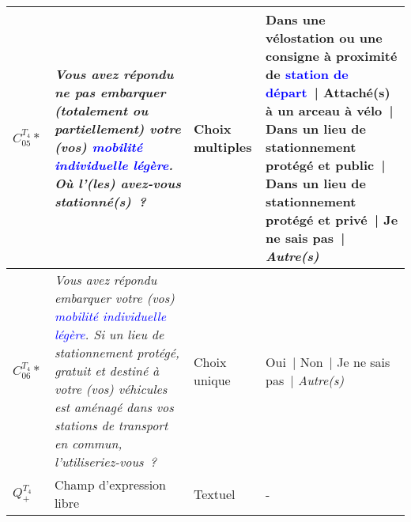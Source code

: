 \begin{table}[h!]
{\begin{tabular}{p{}p{}p{}p{}}
\hline
    \small{\(C_{05}^{T_{4}}*\)} & \small{\textsl{Vous avez répondu ne pas embarquer (totalement ou partiellement) votre (vos) \textcolor{blue}{mobilité individuelle légère}. Où l'(les) avez-vous stationné(s)~?}} & \small{Choix multiples} & \small{Dans une vélostation ou une consigne à proximité de \textcolor{blue}{station de départ}~| Attaché(s) à un arceau à vélo~| Dans un lieu de stationnement protégé et public~| Dans un lieu de stationnement protégé et privé~| Je ne sais pas~| \textsl{Autre(s)}}\\
\hline
    \small{\(C_{06}^{T_{4}}*\)} & \small{\textsl{Vous avez répondu embarquer votre (vos) \textcolor{blue}{mobilité individuelle légère}. Si un lieu de stationnement protégé, gratuit et destiné à votre (vos) véhicules est aménagé dans vos stations de transport en commun, l'utiliseriez-vous~?}} & \small{Choix unique} & \small{Oui~| Non~| Je ne sais pas~| \textsl{Autre(s)}}\\
\hline
    \small{\textbf{\(Q_{+}^{T_{4}}\)}} & \small{Champ d'expression libre} & \small{Textuel} & \small{-}\\
      \hline
    \end{tabular}}
    \caption*{}
    \vspace{5pt}
        \end{table}

